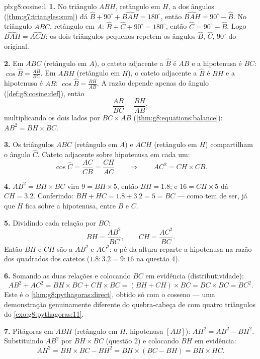 \begin{solution}{pb:g8:cosine:1}
\textbf{1.} No triângulo $ABH$, retângulo em $H$, a  dos ângulos
(\cref{thm:g7:triangles:sum}) dá
$\widehat B + 90^\circ + \widehat{BAH} = 180^\circ$, então
$\widehat{BAH} = 90^\circ - \widehat B$. No triângulo $ABC$, retângulo
em $A$: $\widehat B + \widehat C + 90^\circ = 180^\circ$, então
$\widehat C = 90^\circ - \widehat B$. Logo
$\widehat{BAH} = \widehat{ACB}$: os dois triângulos pequenos repetem os
ângulos $\widehat B$, $\widehat C$, $90^\circ$ do original.

\textbf{2.} Em $ABC$ (retângulo em $A$), o cateto adjacente a
$\widehat B$ é $AB$ e a hipotenusa é $BC$:
$\cos\widehat B = \frac{AB}{BC}$. Em $ABH$ (retângulo em $H$), o cateto
adjacente a $\widehat B$ é $BH$ e a hipotenusa é $AB$:
$\cos\widehat B = \frac{BH}{AB}$. A razão depende apenas do ângulo
(\cref{def:g8:cosine:def}), então
\[
\frac{AB}{BC} = \frac{BH}{AB} ;
\]
multiplicando os dois lados por $BC \times AB$
(\cref{thm:g8:equations:balance}): $AB^2 = BH \times BC$.

\textbf{3.} Os triângulos $ABC$ (retângulo em $A$) e $ACH$ (retângulo
em $H$) compartilham o ângulo $\widehat C$. Cateto adjacente sobre
hipotenusa em cada um:
\[
\cos\widehat C = \frac{AC}{CB} = \frac{CH}{AC}
\qquad\Longrightarrow\qquad
AC^2 = CH \times CB .
\]

\textbf{4.} $AB^2 = BH \times BC$ vira $9 = BH \times 5$, então
$BH = 1.8$; e $16 = CH \times 5$ dá $CH = 3.2$. Conferindo:
$BH + HC = 1.8 + 3.2 = 5 = BC$ --- como tem de ser, já que $H$ fica
sobre a hipotenusa, entre $B$ e $C$.

\textbf{5.} Dividindo cada relação por $BC$:
\[
BH = \frac{AB^2}{BC},
\qquad
CH = \frac{AC^2}{BC} .
\]
Então $BH$ e $CH$ são  a $AB^2$ e $AC^2$: o pé da altura
reparte a hipotenusa na razão dos quadrados dos catetos
($1.8 : 3.2 = 9 : 16$ na questão 4).

\textbf{6.} Somando as duas relações e colocando $BC$ em evidência
(distributividade):
\[
AB^2 + AC^2 = BH \times BC + CH \times BC
= (BH + CH) \times BC = BC \times BC = BC^2 .
\]
Este é o \cref{thm:g8:pythagoras:direct}, obtido só com o cosseno ---
uma demonstração genuinamente diferente do quebra-cabeça de  com
quatro triângulos do \cref{exo:g8:pythagoras:11}.

\textbf{7.} Pitágoras em $ABH$ (retângulo em $H$, hipotenusa $[AB]$):
$AH^2 = AB^2 - BH^2$. Substituindo $AB^2$ por $BH \times BC$ (questão
2) e colocando $BH$ em evidência:
\[
AH^2 = BH \times BC - BH^2
= BH \times (BC - BH)
= BH \times HC .
\]


\end{solution}

